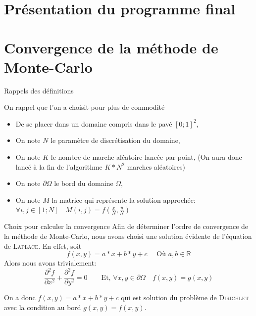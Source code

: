 \documentclass{beamer}
\begin{document}
\section{Présentation du programme final}

\section{Convergence de la méthode de Monte-Carlo}

\begin{frame}{Rappels des définitions}
    \begin{block}{On rappel que l'on a choisit pour plus de commodité}
        \begin{itemize}
            \item De se placer dans un domaine compris dans le pavé $[0;1]^2$,
            \item On note $N$ le paramètre de discrétisation du domaine,
            \item On note $K$ le nombre de marche aléatoire lancée par point,
                (On aura donc lancé à la fin de l'algorithme $K*N^2$ marches aléatoires)
            \item On note $\partial \Omega$ le bord du domaine $\Omega$,
            \item On note $M$ la matrice qui représente la solution approchée:
                $\forall i,j \in [1;N] \quad M(i,j) = f(\frac{x}{N}, \frac{y}{N})$
        \end{itemize}
    \end{block}
\end{frame}

\begin{frame}{Choix pour calculer la convergence}
    Afin de déterminer l'ordre de convergence de la méthode de Monte-Carlo, nous avons choisi une
    solution évidente de l'équation de \textsc{Laplace}. En effet, soit
    \[
        f(x,y) = a*x + b*y + c \quad \mbox{ Où } a, b \in \mathbb{R}
    \]
    Alors nous avons trivialement:
    \[
        \frac{\partial^2 f}{\partial x^2} + \frac{\partial^2 f}{\partial y^2} = 0
        \qquad \mbox{Et, } \forall x,y \in \partial \Omega \quad f(x,y) = g(x,y)
    \]
    \begin{block}{On a donc}
        $f(x,y) = a*x + b*y + c$ qui est solution du problème de \textsc{Dirichlet} avec la condition au bord $g(x,y) = f(x,y)$.
    \end{block}

\end{frame}
\end{document}
